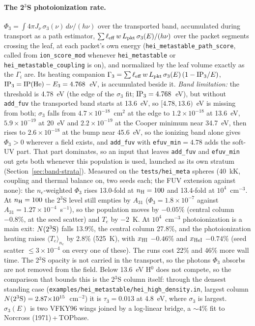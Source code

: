 \documentclass[english,a4paper]{my_memo}
\newcommand{\code}[1]{\texttt{#1}}
\begin{document}
\paragraph{The 2$^3$S photoionization rate.}\label{sec:hei-phi3}
$\Phi_3 = \int 4\pi J_\nu\,\sigma_3(\nu)\,d\nu/(h\nu)$ over the
transported band, accumulated during transport as a path estimator,
$\sum \ell_{\rm eff}\,w\,L_{\rm pkt}\,\sigma_3(E)/(h\nu)$ over the packet
segments crossing the leaf, at each packet's own energy
(\code{hei\_metastable\_path\_score}, called from \code{ion\_score\_mod}
whenever \code{hei\_metastable} or \code{hei\_metastable\_coupling} is on),
and normalized by the leaf volume exactly as the $\Gamma_i$ are.  Its
heating companion $\Gamma_3 = \sum \ell_{\rm eff}\,w\,L_{\rm pkt}\,
\sigma_3(E)\,(1 - {\rm IP}_3/E)$, ${\rm IP}_3 = {\rm IP(He)} - E_3 =
4.768$~eV, is accumulated beside it.  \emph{Band limitation:} the threshold
is 4.78~eV (the edge of the $\sigma_3$ fit; ${\rm IP}_3 = 4.768$~eV), but
without \code{add\_fuv} the transported band starts at 13.6~eV, so
$[4.78, 13.6)$~eV is missing from both; $\sigma_3$ falls from
$4.7{\times}10^{-18}$~cm$^2$ at the edge to $1.2{\times}10^{-18}$ at
13.6~eV, $5.9{\times}10^{-19}$ at 20~eV and $2.2{\times}10^{-19}$ at the
Cooper minimum near 34.7~eV, then rises to $2.6{\times}10^{-18}$ at the bump
near 45.6~eV, so the ionizing band alone gives
$\Phi_3>0$ wherever a field exists, and \code{add\_fuv} with
\code{efuv\_min}$=4.78$ adds the soft-UV part.  That part dominates, so an
input that leaves \code{add\_fuv} and \code{efuv\_min} out gets both
whenever this population is used, launched as its own stratum
(Section~\ref{sec:band-strata}).  Measured on the \code{tests/hei\_meta}
spheres (40~kK, coupling and thermal balance on, two seeds each; the FUV
extension against none): the $n_e$-weighted $\Phi_3$ rises 13.0-fold at
$n_{\rm H}=100$ and 13.4-fold at $10^4$~cm$^{-3}$.  At $n_{\rm H}=100$ the
2$^3$S level still empties by $A_{31}$ ($\Phi_3 = 1.8{\times}10^{-7}$ against
$A_{31}=1.27{\times}10^{-4}$~s$^{-1}$), so the population moves by
$-0.05\%$ (central column $-0.8\%$, at the seed scatter) and $T_e$ by
$-2$~K.  At $10^4$~cm$^{-3}$ photoionization is a main exit:
$N(2^3{\rm S})$ falls 13.9\%, the central column 27.8\%, and the
photoionization heating raises $\langle T_e\rangle_{n_e}$ by 2.8\% (525~K),
with $x_{\rm HI}$ $-0.46\%$ and $x_{\rm HeI}$ $-0.74\%$ (seed scatter
$\le3{\times}10^{-4}$ on every one of these).  The runs cost 22\% and 46\%
more wall time.  The 2$^3$S opacity is not
carried in the transport, so the photons $\Phi_3$ absorbs are not removed
from the field.  Below 13.6~eV H$^0$ does not compete, so the comparison that
bounds this is the 2$^3$S column itself: through the densest standing case
(\code{examples/hei\_metastable/hei\_high\_density.in},
largest column $N(2^3{\rm S}) = 2.87{\times}10^{15}$~cm$^{-2}$)
it is $\tau_3 = 0.013$ at 4.8~eV, where $\sigma_3$ is largest.  $\sigma_3(E)$ is two VFKY96 wings joined by a
log-linear bridge, a $\sim$4\% fit to Norcross (1971)\,+\,TOPbase.
\end{document}
